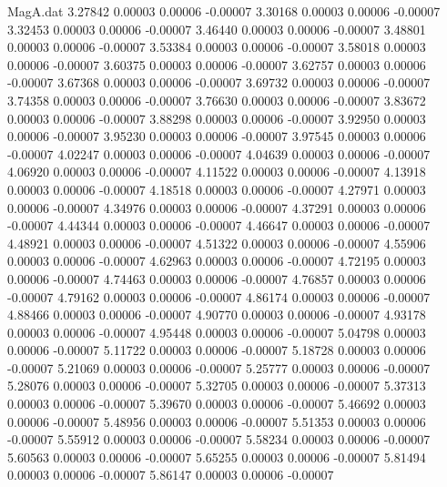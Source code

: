 \begin{filecontents}{MagA.dat}
   3.27842    0.00003    0.00006   -0.00007
   3.30168    0.00003    0.00006   -0.00007
   3.32453    0.00003    0.00006   -0.00007
   3.46440    0.00003    0.00006   -0.00007
   3.48801    0.00003    0.00006   -0.00007
   3.53384    0.00003    0.00006   -0.00007
   3.58018    0.00003    0.00006   -0.00007
   3.60375    0.00003    0.00006   -0.00007
   3.62757    0.00003    0.00006   -0.00007
   3.67368    0.00003    0.00006   -0.00007
   3.69732    0.00003    0.00006   -0.00007
   3.74358    0.00003    0.00006   -0.00007
   3.76630    0.00003    0.00006   -0.00007
   3.83672    0.00003    0.00006   -0.00007
   3.88298    0.00003    0.00006   -0.00007
   3.92950    0.00003    0.00006   -0.00007
   3.95230    0.00003    0.00006   -0.00007
   3.97545    0.00003    0.00006   -0.00007
   4.02247    0.00003    0.00006   -0.00007
   4.04639    0.00003    0.00006   -0.00007
   4.06920    0.00003    0.00006   -0.00007
   4.11522    0.00003    0.00006   -0.00007
   4.13918    0.00003    0.00006   -0.00007
   4.18518    0.00003    0.00006   -0.00007
   4.27971    0.00003    0.00006   -0.00007
   4.34976    0.00003    0.00006   -0.00007
   4.37291    0.00003    0.00006   -0.00007
   4.44344    0.00003    0.00006   -0.00007
   4.46647    0.00003    0.00006   -0.00007
   4.48921    0.00003    0.00006   -0.00007
   4.51322    0.00003    0.00006   -0.00007
   4.55906    0.00003    0.00006   -0.00007
   4.62963    0.00003    0.00006   -0.00007
   4.72195    0.00003    0.00006   -0.00007
   4.74463    0.00003    0.00006   -0.00007
   4.76857    0.00003    0.00006   -0.00007
   4.79162    0.00003    0.00006   -0.00007
   4.86174    0.00003    0.00006   -0.00007
   4.88466    0.00003    0.00006   -0.00007
   4.90770    0.00003    0.00006   -0.00007
   4.93178    0.00003    0.00006   -0.00007
   4.95448    0.00003    0.00006   -0.00007
   5.04798    0.00003    0.00006   -0.00007
   5.11722    0.00003    0.00006   -0.00007
   5.18728    0.00003    0.00006   -0.00007
   5.21069    0.00003    0.00006   -0.00007
   5.25777    0.00003    0.00006   -0.00007
   5.28076    0.00003    0.00006   -0.00007
   5.32705    0.00003    0.00006   -0.00007
   5.37313    0.00003    0.00006   -0.00007
   5.39670    0.00003    0.00006   -0.00007
   5.46692    0.00003    0.00006   -0.00007
   5.48956    0.00003    0.00006   -0.00007
   5.51353    0.00003    0.00006   -0.00007
   5.55912    0.00003    0.00006   -0.00007
   5.58234    0.00003    0.00006   -0.00007
   5.60563    0.00003    0.00006   -0.00007
   5.65255    0.00003    0.00006   -0.00007
   5.81494    0.00003    0.00006   -0.00007
   5.86147    0.00003    0.00006   -0.00007

\end{filecontents}
